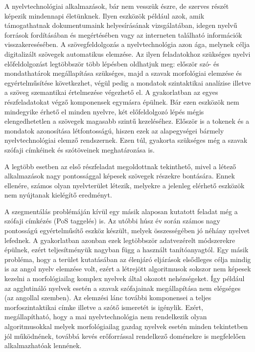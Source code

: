 
A nyelvtechnológiai alkalmazások, bár nem vesszük észre, de szerves részét képezik mindennapi életünknek.
Ilyen eszközök például azok, amik támogathatnak dokumentumaink helyesírásának vizsgálatában, idegen nyelvű források fordításában és megértésében vagy az interneten található információk visszakeresésében.
A szövegfeldolgozás a nyelvtechnológia azon ága, melynek célja digitalizált szövegek automatikus elemzése.
Az ilyen feladatokhoz szükséges nyelvi előfeldolgozást legtöbbször több lépésben oldhatjuk meg: először szó- és mondathatárok megállapítása szükséges, majd a szavak morfológiai elemzése és egyértelműsítése következhet, végül pedig a mondatok szintaktikai analízise illetve a szöveg szemantikai értelmezése végezhető el.
A gyakorlatban az egyes részfeladatokat végző komponensek egymásra épülnek.
Bár ezen eszközök nem mindegyike érhető el minden nyelvre, két előfeldolgozó lépés mégis elengedhetetlen a szövegek magasabb szintű kezeléséhez. 
Először is a tokenek és a mondatok azonosítása létfontosságú, hiszen ezek az alapegységei bármely nyelvtechnológiai elemző rendszernek.
Ezen túl, gyakorta szükséges még a szavak szófaji címkéinek és szótöveinek meghatározása is.

A legtöbb esetben az első részfeladat megoldottnak tekinthető, mivel a létező alkalmazások nagy pontossággal képesek szövegek részekre bontására.
Ennek ellenére, számos olyan nyelvterület létezik, melyekre a jelenleg elérhető eszközök nem nyújtanak kielégítő eredményt.

A szegmentálás problémáján kívül egy másik alaposan kutatott feladat még a szófaji címkézés (PoS taggelés) is.
Az utóbbi húsz év során számos nagy pontosságú egyértelműsítő eszköz készült, melyek összességében jó néhány nyelvet lefednek.
A gyakorlatban azonban ezek legtöbbször adatvezérelt módszerekre épülnek, ezért teljesítményük nagyban függ a használt tanítóanyagtól.
Egy másik probléma, hogy a terület kutatásában az élenjáró eljárások elsődleges célja mindig is az angol nyelv elemzése volt, ezért a létrejött algoritmusok sokszor nem képesek kezelni a morfológiailag komplex nyelvek által okozott nehézségeket.
Így például az agglutináló nyelvek esetén a szavak szófajainak megállapítása nem elégséges (az angollal szemben).
Az elemzési lánc további komponensei a teljes morfoszintaktikai címke illetve a szótő ismeretét is igénylik.
Ezért, megállapítható, hogy a mai nyelvtechnológia nem rendelkezik olyan algoritmusokkal melyek morfológiailag gazdag nyelvek esetén minden tekintetben jól működnének, továbbá kevés erőforrással rendelkező doménekre is megfelelően alkalmazhatóak lennének.

